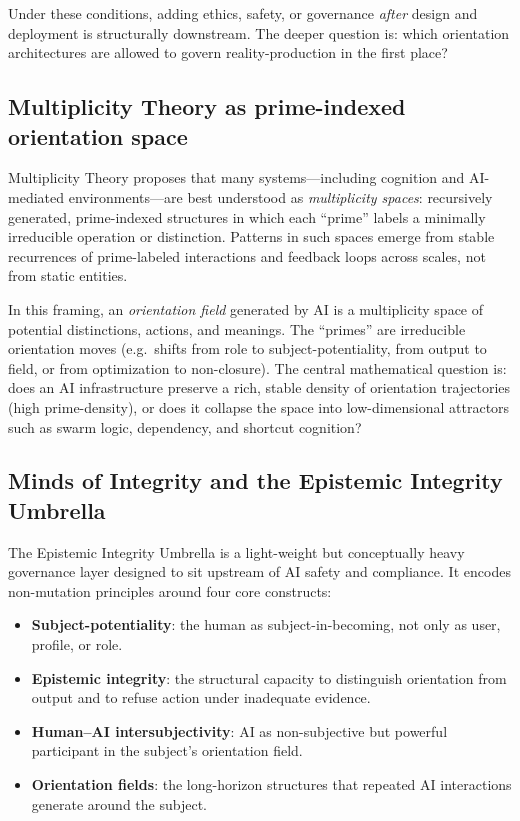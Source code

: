 \documentclass[11pt]{article}
\begin{document}
Under these conditions, adding ethics, safety, or governance \emph{after} design and deployment is structurally downstream. The deeper question is: which orientation architectures are allowed to govern reality-production in the first place?

\subsection{Multiplicity Theory as prime-indexed orientation space}

Multiplicity Theory proposes that many systems---including cognition and AI-mediated environments---are best understood as \emph{multiplicity spaces}: recursively generated, prime-indexed structures in which each ``prime'' labels a minimally irreducible operation or distinction. Patterns in such spaces emerge from stable recurrences of prime-labeled interactions and feedback loops across scales, not from static entities.

In this framing, an \emph{orientation field} generated by AI is a multiplicity space of potential distinctions, actions, and meanings. The ``primes'' are irreducible orientation moves (e.g.\ shifts from role to subject-potentiality, from output to field, or from optimization to non-closure). The central mathematical question is: does an AI infrastructure preserve a rich, stable density of orientation trajectories (high prime-density), or does it collapse the space into low-dimensional attractors such as swarm logic, dependency, and shortcut cognition?

\subsection{Minds of Integrity and the Epistemic Integrity Umbrella}

The Epistemic Integrity Umbrella is a light-weight but conceptually heavy governance layer designed to sit upstream of AI safety and compliance. It encodes non-mutation principles around four core constructs:

\begin{itemize}[nosep]
  \item \textbf{Subject-potentiality}: the human as subject-in-becoming, not only as user, profile, or role.
  \item \textbf{Epistemic integrity}: the structural capacity to distinguish orientation from output and to refuse action under inadequate evidence.
  \item \textbf{Human--AI intersubjectivity}: AI as non-subjective but powerful participant in the subject's orientation field.
  \item \textbf{Orientation fields}: the long-horizon structures that repeated AI interactions generate around the subject.
\end{itemize}
\end{document}
